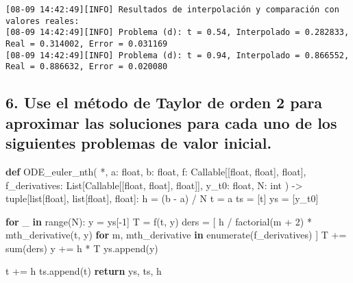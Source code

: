 \documentclass[
  letterpaper,
  DIV=11,
  numbers=noendperiod]{scrartcl}
\newenvironment{Shaded}{\begin{snugshade}}{\end{snugshade}}
\newcommand{\BuiltInTok}[1]{\textcolor[rgb]{0.00,0.23,0.31}{#1}}
\newcommand{\ControlFlowTok}[1]{\textcolor[rgb]{0.00,0.23,0.31}{\textbf{#1}}}
\newcommand{\DecValTok}[1]{\textcolor[rgb]{0.68,0.00,0.00}{#1}}
\newcommand{\KeywordTok}[1]{\textcolor[rgb]{0.00,0.23,0.31}{\textbf{#1}}}
\newcommand{\NormalTok}[1]{\textcolor[rgb]{0.00,0.23,0.31}{#1}}
\newcommand{\OperatorTok}[1]{\textcolor[rgb]{0.37,0.37,0.37}{#1}}
\begin{document}
\begin{verbatim}
[08-09 14:42:49][INFO] Resultados de interpolación y comparación con valores reales:
[08-09 14:42:49][INFO] Problema (d): t = 0.54, Interpolado = 0.282833, Real = 0.314002, Error = 0.031169
[08-09 14:42:49][INFO] Problema (d): t = 0.94, Interpolado = 0.866552, Real = 0.886632, Error = 0.020080
\end{verbatim}

\subsection{6. Use el método de Taylor de orden 2 para aproximar las
soluciones para cada uno de los siguientes problemas de valor
inicial.}\label{use-el-muxe9todo-de-taylor-de-orden-2-para-aproximar-las-soluciones-para-cada-uno-de-los-siguientes-problemas-de-valor-inicial.}

\begin{Shaded}
\begin{Highlighting}[]
\KeywordTok{def}\NormalTok{ ODE\_euler\_nth(}
    \OperatorTok{*}\NormalTok{,}
\NormalTok{    a: }\BuiltInTok{float}\NormalTok{,}
\NormalTok{    b: }\BuiltInTok{float}\NormalTok{,}
\NormalTok{    f: Callable[[}\BuiltInTok{float}\NormalTok{, }\BuiltInTok{float}\NormalTok{], }\BuiltInTok{float}\NormalTok{],}
\NormalTok{    f\_derivatives: List[Callable[[}\BuiltInTok{float}\NormalTok{, }\BuiltInTok{float}\NormalTok{], }\BuiltInTok{float}\NormalTok{]],}
\NormalTok{    y\_t0: }\BuiltInTok{float}\NormalTok{,}
\NormalTok{    N: }\BuiltInTok{int}
\NormalTok{) }\OperatorTok{{-}\textgreater{}} \BuiltInTok{tuple}\NormalTok{[}\BuiltInTok{list}\NormalTok{[}\BuiltInTok{float}\NormalTok{], }\BuiltInTok{list}\NormalTok{[}\BuiltInTok{float}\NormalTok{], }\BuiltInTok{float}\NormalTok{]:}
\NormalTok{    h }\OperatorTok{=}\NormalTok{ (b }\OperatorTok{{-}}\NormalTok{ a) }\OperatorTok{/}\NormalTok{ N}
\NormalTok{    t }\OperatorTok{=}\NormalTok{ a}
\NormalTok{    ts }\OperatorTok{=}\NormalTok{ [t]}
\NormalTok{    ys }\OperatorTok{=}\NormalTok{ [y\_t0]}

    \ControlFlowTok{for}\NormalTok{ \_ }\KeywordTok{in} \BuiltInTok{range}\NormalTok{(N):}
\NormalTok{        y }\OperatorTok{=}\NormalTok{ ys[}\OperatorTok{{-}}\DecValTok{1}\NormalTok{]}
\NormalTok{        T }\OperatorTok{=}\NormalTok{ f(t, y)}
\NormalTok{        ders }\OperatorTok{=}\NormalTok{ [}
\NormalTok{            h }\OperatorTok{/}\NormalTok{ factorial(m }\OperatorTok{+} \DecValTok{2}\NormalTok{) }\OperatorTok{*}\NormalTok{ mth\_derivative(t, y)}
            \ControlFlowTok{for}\NormalTok{ m, mth\_derivative }\KeywordTok{in} \BuiltInTok{enumerate}\NormalTok{(f\_derivatives)}
\NormalTok{        ]}
\NormalTok{        T }\OperatorTok{+=} \BuiltInTok{sum}\NormalTok{(ders)}
\NormalTok{        y }\OperatorTok{+=}\NormalTok{ h }\OperatorTok{*}\NormalTok{ T}
\NormalTok{        ys.append(y)}

\NormalTok{        t }\OperatorTok{+=}\NormalTok{ h}
\NormalTok{        ts.append(t)}
    \ControlFlowTok{return}\NormalTok{ ys, ts, h}
\end{Highlighting}
\end{Shaded}
\end{document}
